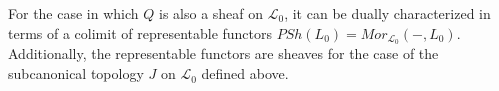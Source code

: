 \begin{frame}
For the case in which $Q$ is also a sheaf on $\mathcal{L}_0$, it can be dually characterized in terms of a colimit of representable functors $PSh(L_0) = Mor_{\mathcal{L}_0}(-,L_0)$. Additionally, the representable functors are sheaves for the case of the subcanonical topology $J$ on $\mathcal{L}_0$ defined above. 
\end{frame}
